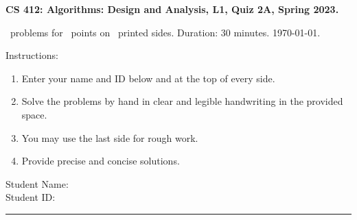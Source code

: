 \documentclass[addpoints,a4paper]{exam}
\begin{document}
\begin{flushleft}
  { \large \textsf{\textbf{CS 412: Algorithms: Design and Analysis, L1, Quiz 2A, Spring 2023.}}}\vspace{.5em}
  
  \numquestions\ problems for \numpoints\ points on \numpages\ printed sides. Duration: 30 minutes. \today.
\end{flushleft}

Instructions:
\begin{enumerate}
\item Enter your name and ID below and at the top of every side.
\item Solve the problems by hand in clear and legible handwriting in the provided space.
\item You may use the last side for rough work.
\item Provide precise and concise solutions.
\end{enumerate}

\noindent Student Name: \hrulefill \\[5pt]
\noindent Student ID: \hrulefill \\
\rule{\textwidth}{1pt}
\end{document}
